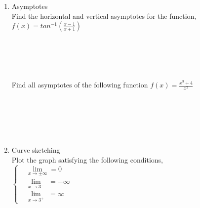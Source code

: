 \documentclass[12px]{article}
\begin{document}
\begin{enumerate}
\begin{enumerate}[(1)]
        \newpage
        
        \item Asymptotes\\
        Find the horizontal and vertical asymptotes for the function, $f(x)=tan^{-1}({\frac{x-1}{x+1}})$\\
        \\
        \\
        \\
        \\
        \\
        Find all asymptotes of the following function $f(x)=\frac{x^3+4}{x^2}$\\
        \\
        \\
        \\
        \\
        \\
        
        \item Curve sketching\\
        \hspace*{2em} Plot the graph satisfying the following conditions,\\
        \begin{equation}
            \left\{
            \begin{aligned}
                &\lim\limits_{x\to\pm\infty}=0\\
                &\lim\limits_{x\to3^-}\ \,=-\infty\\
                &\lim\limits_{x\to3^+}\ \,=\infty
            \end{aligned}
            \right.\nonumber\hspace{36em}
        \end{equation}
    \end{enumerate}

\end{enumerate}
\end{document}

